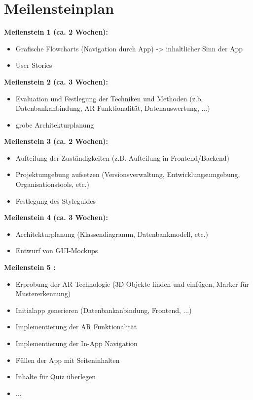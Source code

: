 \section{Meilensteinplan}\label{Meilensteinplan}
\textbf{Meilenstein 1  (ca. 2 Wochen):}
\begin{itemize}
\item Grafische Flowcharts (Navigation durch App) -> inhaltlicher Sinn der App
\item User Stories
\end{itemize}

\textbf{Meilenstein 2  (ca. 3 Wochen):}
\begin{itemize}
\item Evaluation und Festlegung der Techniken und Methoden (z.b. Datenbankanbindung, AR Funktionalität, Datenauswertung, ...)
\item grobe Architekturplanung
\end{itemize}

\textbf{Meilenstein 3  (ca. 2 Wochen):}
\begin{itemize}
\item Aufteilung der Zuständigkeiten (z.B. Aufteilung in Frontend/Backend)
\item Projektumgebung aufsetzen (Versionsverwaltung, Entwicklungsumgebung, Organisationstools, etc.)
\item Festlegung des Styleguides
\end{itemize}

\textbf{Meilenstein 4  (ca. 3 Wochen):}
\begin{itemize}
\item Architekturplanung (Klassendiagramm, Datenbankmodell, etc.)
\item Entwurf von GUI-Mockups
\end{itemize}

\textbf{Meilenstein 5 :}
\begin{itemize}
\item Erprobung der AR Technologie (3D Objekte finden und einfügen, Marker für Mustererkennung)
\item Initialapp generieren (Datenbankanbindung, Frontend, ...)
\item Implementierung der AR Funktionalität
\item Implementierung der In-App Navigation
\item Füllen der App mit Seiteninhalten
\item Inhalte für Quiz überlegen
\item ...
\end{itemize}


